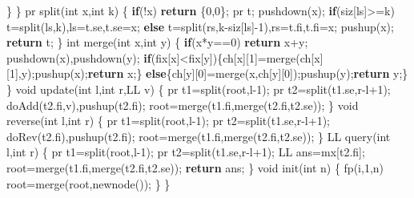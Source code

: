 \documentclass[
]{article}
\newenvironment{Shaded}{}{}
\newcommand{\ControlFlowTok}[1]{\textcolor[rgb]{0.00,0.44,0.13}{\textbf{#1}}}
\newcommand{\DataTypeTok}[1]{\textcolor[rgb]{0.56,0.13,0.00}{#1}}
\newcommand{\DecValTok}[1]{\textcolor[rgb]{0.25,0.63,0.44}{#1}}
\newcommand{\NormalTok}[1]{#1}
\begin{document}
\begin{Shaded}
\begin{Highlighting}[]
\NormalTok{        \}}
\NormalTok{    \}}
\NormalTok{    pr split(}\DataTypeTok{int}\NormalTok{ x,}\DataTypeTok{int}\NormalTok{ k)}
\NormalTok{    \{}
        \ControlFlowTok{if}\NormalTok{(!x) }\ControlFlowTok{return}\NormalTok{ \{}\DecValTok{0}\NormalTok{,}\DecValTok{0}\NormalTok{\};}
\NormalTok{        pr t; pushdown(x);}
        \ControlFlowTok{if}\NormalTok{(siz[ls]\textgreater{}=k) t=split(ls,k),ls=t.se,t.se=x;}
        \ControlFlowTok{else}\NormalTok{ t=split(rs,k{-}siz[ls]{-}}\DecValTok{1}\NormalTok{),rs=t.fi,t.fi=x;}
\NormalTok{        pushup(x); }\ControlFlowTok{return}\NormalTok{ t;}
\NormalTok{    \}}
    \DataTypeTok{int}\NormalTok{ merge(}\DataTypeTok{int}\NormalTok{ x,}\DataTypeTok{int}\NormalTok{ y)}
\NormalTok{    \{}
        \ControlFlowTok{if}\NormalTok{(x*y==}\DecValTok{0}\NormalTok{) }\ControlFlowTok{return}\NormalTok{ x+y;}
\NormalTok{        pushdown(x),pushdown(y);}
        \ControlFlowTok{if}\NormalTok{(fix[x]\textless{}fix[y])\{ch[x][}\DecValTok{1}\NormalTok{]=merge(ch[x][}\DecValTok{1}\NormalTok{],y);pushup(x);}\ControlFlowTok{return}\NormalTok{ x;\}}
        \ControlFlowTok{else}\NormalTok{\{ch[y][}\DecValTok{0}\NormalTok{]=merge(x,ch[y][}\DecValTok{0}\NormalTok{]);pushup(y);}\ControlFlowTok{return}\NormalTok{ y;\}}
\NormalTok{    \}}
    \DataTypeTok{void}\NormalTok{ update(}\DataTypeTok{int}\NormalTok{ l,}\DataTypeTok{int}\NormalTok{ r,LL v)}
\NormalTok{    \{}
\NormalTok{        pr t1=split(root,l{-}}\DecValTok{1}\NormalTok{);}
\NormalTok{        pr t2=split(t1.se,r{-}l+}\DecValTok{1}\NormalTok{);}
\NormalTok{        doAdd(t2.fi,v),pushup(t2.fi);}
\NormalTok{        root=merge(t1.fi,merge(t2.fi,t2.se));}
\NormalTok{    \}}
    \DataTypeTok{void}\NormalTok{ reverse(}\DataTypeTok{int}\NormalTok{ l,}\DataTypeTok{int}\NormalTok{ r)}
\NormalTok{    \{}
\NormalTok{        pr t1=split(root,l{-}}\DecValTok{1}\NormalTok{);}
\NormalTok{        pr t2=split(t1.se,r{-}l+}\DecValTok{1}\NormalTok{);}
\NormalTok{        doRev(t2.fi),pushup(t2.fi);}
\NormalTok{        root=merge(t1.fi,merge(t2.fi,t2.se));}
\NormalTok{    \}}
\NormalTok{    LL query(}\DataTypeTok{int}\NormalTok{ l,}\DataTypeTok{int}\NormalTok{ r)}
\NormalTok{    \{}
\NormalTok{        pr t1=split(root,l{-}}\DecValTok{1}\NormalTok{);}
\NormalTok{        pr t2=split(t1.se,r{-}l+}\DecValTok{1}\NormalTok{);}
\NormalTok{        LL ans=mx[t2.fi];}
\NormalTok{        root=merge(t1.fi,merge(t2.fi,t2.se));}
        \ControlFlowTok{return}\NormalTok{ ans;}
\NormalTok{    \}}
    \DataTypeTok{void}\NormalTok{ init(}\DataTypeTok{int}\NormalTok{ n)}
\NormalTok{    \{}
\NormalTok{        fp(i,}\DecValTok{1}\NormalTok{,n) root=merge(root,newnode());}
\NormalTok{    \}}
\NormalTok{\}}
\end{Highlighting}
\end{Shaded}
\end{document}
